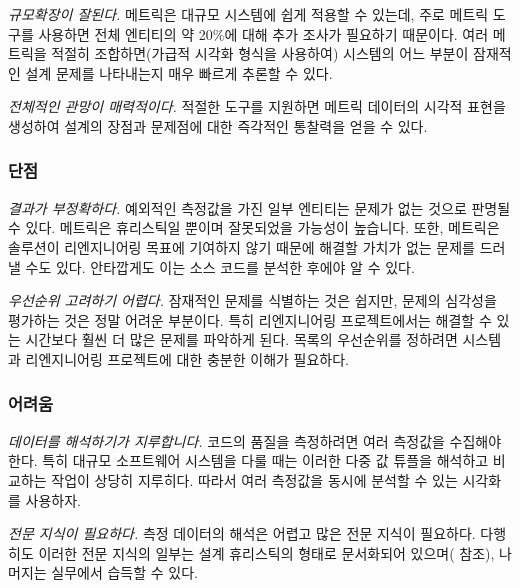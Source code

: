 \documentclass[a4paper,10pt,twoside]{book}
\begin{document}
\begin{bulletlist}
\item \emph{규모확장이 잘된다.}
메트릭은 대규모 시스템에 쉽게 적용할 수 있는데, 주로 메트릭 도구를 사용하면 전체 엔티티의 약 20\%에 대해 추가 조사가 필요하기 때문이다. 여러 메트릭을 적절히 조합하면(가급적 시각화 형식을 사용하여) 시스템의 어느 부분이 잠재적인 설계 문제를 나타내는지 매우 빠르게 추론할 수 있다.

\item \emph{전체적인 관망이 매력적이다.}
적절한 도구를 지원하면 메트릭 데이터의 시각적 표현을 생성하여 설계의 장점과 문제점에 대한 즉각적인 통찰력을 얻을 수 있다.
\end{bulletlist}

\subsubsection*{단점}

\begin{bulletlist}
\item \emph{결과가 부정확하다.}
예외적인 측정값을 가진 일부 엔티티는 문제가 없는 것으로 판명될 수 있다. 메트릭은 휴리스틱일 뿐이며 잘못되었을 가능성이 높습니다. 또한, 메트릭은 솔루션이 리엔지니어링 목표에 기여하지 않기 때문에 해결할 가치가 없는 문제를 드러낼 수도 있다. 안타깝게도 이는 소스 코드를 분석한 후에야 알 수 있다.

\item \emph{우선순위 고려하기 어렵다.}
잠재적인 문제를 식별하는 것은 쉽지만, 문제의 심각성을 평가하는 것은 정말 어려운 부분이다. 특히 리엔지니어링 프로젝트에서는 해결할 수 있는 시간보다 훨씬 더 많은 문제를 파악하게 된다. 목록의 우선순위를 정하려면 시스템과 리엔지니어링 프로젝트에 대한 충분한 이해가 필요하다.
\end{bulletlist}

\subsubsection*{어려움}

\begin{bulletlist}
\item \emph{데이터를 해석하기가 지루합니다.} 
코드의 품질을 측정하려면 여러 측정값을 수집해야 한다. 특히 대규모 소프트웨어 시스템을 다룰 때는 이러한 다중 값 튜플을 해석하고 비교하는 작업이 상당히 지루히다. 따라서 여러 측정값을 동시에 분석할 수 있는 시각화를 사용하자.

\item \emph{전문 지식이 필요하다.}
측정 데이터의 해석은 어렵고 많은 전문 지식이 필요하다. 다행히도 이러한 전문 지식의 일부는 설계 휴리스틱의 형태로 문서화되어 있으며(\cite{Riel96a} \cite{Lore94a} 참조), 나머지는 실무에서 습득할 수 있다.
\end{bulletlist}
\end{document}

